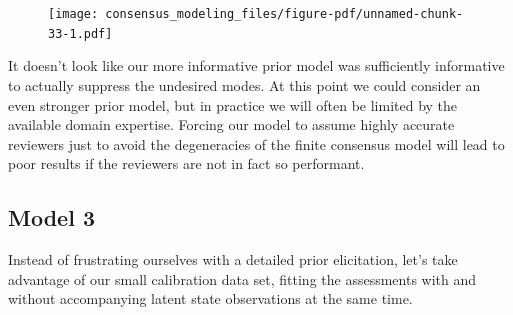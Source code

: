\documentclass[
  letterpaper,
  DIV=11,
  numbers=noendperiod]{scrartcl}
\newenvironment{Shaded}{\begin{snugshade}}{\end{snugshade}}
\newcommand{\AttributeTok}[1]{\textcolor[rgb]{0.40,0.45,0.13}{#1}}
\newcommand{\ControlFlowTok}[1]{\textcolor[rgb]{0.00,0.23,0.31}{#1}}
\newcommand{\DecValTok}[1]{\textcolor[rgb]{0.68,0.00,0.00}{#1}}
\newcommand{\FunctionTok}[1]{\textcolor[rgb]{0.28,0.35,0.67}{#1}}
\newcommand{\NormalTok}[1]{\textcolor[rgb]{0.00,0.23,0.31}{#1}}
\newcommand{\OtherTok}[1]{\textcolor[rgb]{0.00,0.23,0.31}{#1}}
\newcommand{\SpecialCharTok}[1]{\textcolor[rgb]{0.37,0.37,0.37}{#1}}
\newcommand{\StringTok}[1]{\textcolor[rgb]{0.13,0.47,0.30}{#1}}
\begin{document}
\begin{Shaded}
\end{Shaded}

\begin{figure}[H]

{\centering \texttt{[image: consensus\_modeling\_files/figure-pdf/unnamed-chunk-33-1.pdf]}

}

\end{figure}

It doesn't look like our more informative prior model was sufficiently
informative to actually suppress the undesired modes. At this point we
could consider an even stronger prior model, but in practice we will
often be limited by the available domain expertise. Forcing our model to
assume highly accurate reviewers just to avoid the degeneracies of the
finite consensus model will lead to poor results if the reviewers are
not in fact so performant.

\hypertarget{model-3}{%
\subsection{Model 3}\label{model-3}}

Instead of frustrating ourselves with a detailed prior elicitation,
let's take advantage of our small calibration data set, fitting the
assessments with and without accompanying latent state observations at
the same time.
\end{document}
